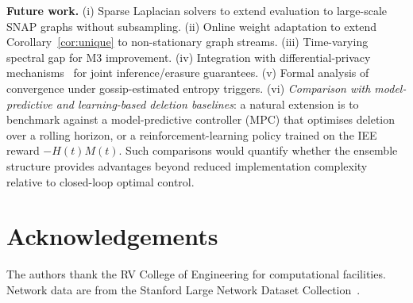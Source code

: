 \documentclass[review,12pt]{elsarticle}
\begin{document}
\textbf{Future work.} (i) Sparse Laplacian solvers to extend evaluation to
large-scale SNAP graphs without subsampling. (ii) Online weight adaptation to
extend Corollary~\ref{cor:unique} to non-stationary graph streams.
(iii) Time-varying spectral gap for M3 improvement.
(iv) Integration with differential-privacy
mechanisms~\cite{dwork2014algorithmic} for joint inference/erasure guarantees.
(v) Formal analysis of convergence under gossip-estimated entropy triggers.
(vi) \emph{Comparison with model-predictive and learning-based deletion
baselines}: a natural extension is to benchmark against a model-predictive
controller (MPC) that optimises deletion over a rolling horizon, or a
reinforcement-learning policy trained on the IEE reward $-H(t)M(t)$.
Such comparisons would quantify whether the ensemble structure provides
advantages beyond reduced implementation complexity relative to
closed-loop optimal control.

\section*{Acknowledgements}

The authors thank the RV College of Engineering for computational facilities.
Network data are from the Stanford Large Network Dataset
Collection~\cite{snapnets}.



\end{document}
